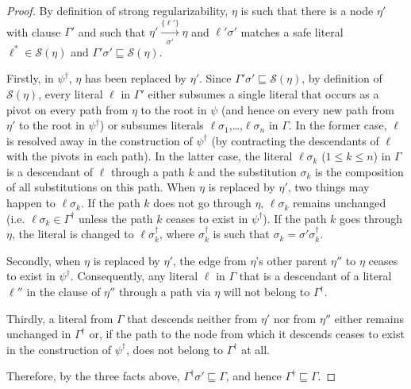 \begin{proof} 
By definition of strong regularizability, $\eta$ is such
that there is a node $\eta'$ with clause $\Gamma'$ and such that
$\eta' \xrightarrow[\sigma']{\{\ell'\} } \eta$ and $\ell'\sigma'$
matches a safe literal $\ell^*\in \mathcal{S}(\eta)$ and
$\Gamma' \sigma' \sqsubseteq \mathcal{S}(\eta)$.

Firstly, in $\psi^{\dagger}$, $\eta$ has been replaced by $\eta'$. Since
$\Gamma' \sigma' \sqsubseteq \mathcal{S}(\eta)$, by definition of
$\mathcal{S}(\eta)$, every literal $\ell$ in $\Gamma'$ either subsumes %
a single literal that occurs as a pivot on every path
from $\eta$ to the root in $\psi$ (and hence on every new path from
$\eta'$ to the root in $\psi^{\dagger}$) or subsumes literals %
$\ell \sigma_1$,\ldots,$\ell\sigma_n$ in $\Gamma$. In the former case,
$\ell$ is resolved away in the construction of $\psi^{\dagger}$ (by
contracting the descendants of $\ell$ with the pivots in each path).
In the latter case, the literal $\ell \sigma_k$ ($1 \leq k \leq n$) in
$\Gamma$ is a descendant of $\ell$ through a path $k$ and the
substitution $\sigma_k$ is the composition of all substitutions on
this path. When $\eta$ is replaced by $\eta'$, two things may happen
to $\ell \sigma_k$. If the path $k$ does not go through $\eta$, 
$\ell \sigma_k$ remains unchanged (i.e. $\ell \sigma_k \in \Gamma^{\dagger}$
unless the path $k$ ceases to exist in $\psi^{\dagger}$). If the path
$k$ goes through $\eta$, the literal is changed to 
$\ell\sigma^{\dagger}_k$, where $\sigma^{\dagger}_k$ is such that 
$\sigma_k = \sigma' \sigma^{\dagger}_k$.

Secondly, when $\eta$ is replaced by $\eta'$, the edge from
$\eta$'s other parent $\eta''$ to $\eta$ ceases to exist in
$\psi^{\dagger}$. Consequently, any literal $\ell$ in $\Gamma$ that is a
descendant of a literal $\ell''$ in the clause of $\eta''$ through a
path via $\eta$ will not belong to $\Gamma^{\dagger}$.


Thirdly, a literal from $\Gamma$ that descends neither from $\eta'$ nor from $\eta''$ either remains unchanged in $\Gamma^{\dagger}$ or, if the path to the node from which it descends ceases to exist in the construction of $\psi^{\dagger}$, does not belong to $\Gamma^{\dagger}$ at all.

Therefore, by the three facts above, $\Gamma^{\dagger} \sigma' \sqsubseteq \Gamma$, and hence $\Gamma^{\dagger} \sqsubseteq \Gamma$.
\end{proof}